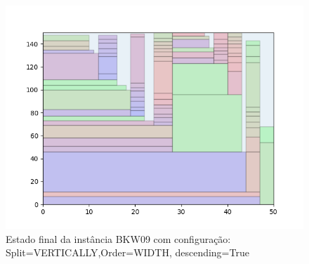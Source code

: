 \begin{figure}[H]
    \centering
    \caption[]{Estado final da instância BKW09 com configuração: Split=VERTICALLY,Order=WIDTH, descending=True}
    \label{fig:bkw09-vertically-width-true}
    \includegraphics[scale=0.5]{output/figures/bkw/bkw09/vertically/width/true/000}
\end{figure}